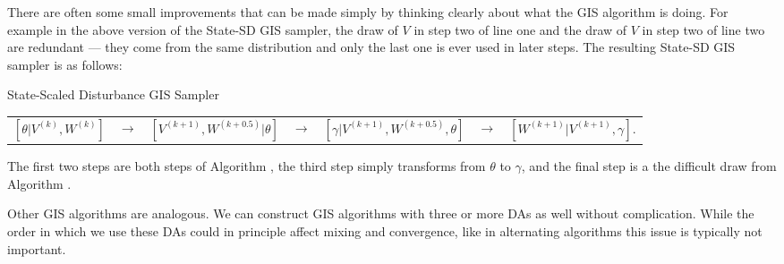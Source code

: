 \documentclass[12pt]{article}
\begin{document}
There are often some small improvements that can be made simply by thinking clearly about what the GIS algorithm is doing. For example in the above version of the State-SD GIS sampler, the draw of $V$ in step two of line one and the draw of $V$ in step two of line two are redundant --- they come from the same distribution and only the last one is ever used in later steps. The resulting State-SD GIS sampler is as follows:
\begin{alg*}State-Scaled Disturbance GIS Sampler
{\small
\label{alg:DLMstateerror}
\begin{center}
\begin{tabular}{lllllll}
$[\theta|V^{(k)},W^{(k)}]$ & $\to$ & $[V^{(k+1)},W^{(k+0.5)}|\theta]$ & $\to$ & $[\gamma|V^{(k+1)},W^{(k+0.5)},\theta]$ & $\to$ & $[W^{(k+1)}|V^{(k+1)},\gamma]$.
\end{tabular}
\end{center}
}
\end{alg*}
\noindent
The first two steps are both steps of Algorithm , the third step simply transforms from $\theta$ to $\gamma$, and the final step is a the difficult draw from Algorithm .

Other GIS algorithms are analogous. We can construct GIS algorithms with three or more DAs as well without complication. While the order in which we use these DAs could in principle affect mixing and convergence, like in alternating algorithms this issue is typically not important.
\end{document}
